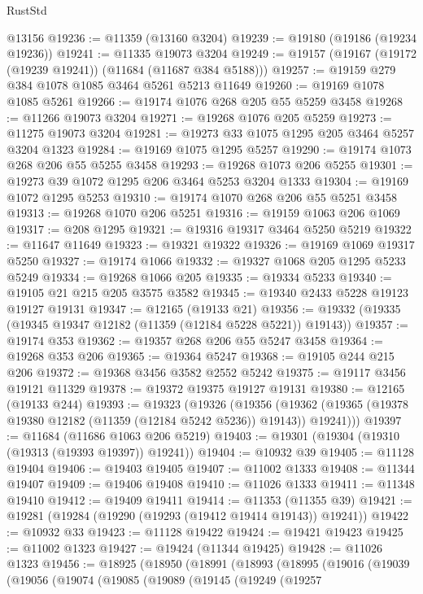 \begin{lexlean}{RustStd}
\begin{coremodule}
{{{{{{{{{{{{{{{{{{{    @13156
@19236 := @11359 (@13160 @3204)
@19239 := @19180 (@19186 (@19234 @19236))
@19241 := @11335 @19073 @3204
@19249 := @19157 (@19167 (@19172 (@19239 @19241)) (@11684 (@11687 @384 @5188)))
@19257 := @19159 @279 @384 @1078 @1085 @3464 @5261 @5213 @11649
@19260 := @19169 @1078 @1085 @5261
@19266 := @19174 @1076 @268 @205 @55 @5259 @3458
@19268 := @11266 @19073 @3204
@19271 := @19268 @1076 @205 @5259
@19273 := @11275 @19073 @3204
@19281 := @19273 @33 @1075 @1295 @205 @3464 @5257 @3204 @1323
@19284 := @19169 @1075 @1295 @5257
@19290 := @19174 @1073 @268 @206 @55 @5255 @3458
@19293 := @19268 @1073 @206 @5255
@19301 := @19273 @39 @1072 @1295 @206 @3464 @5253 @3204 @1333
@19304 := @19169 @1072 @1295 @5253
@19310 := @19174 @1070 @268 @206 @55 @5251 @3458
@19313 := @19268 @1070 @206 @5251
@19316 := @19159 @1063 @206 @1069
@19317 := @208 @1295
@19321 := @19316 @19317 @3464 @5250 @5219
@19322 := @11647 @11649
@19323 := @19321 @19322
@19326 := @19169 @1069 @19317 @5250
@19327 := @19174 @1066
@19332 := @19327 @1068 @205 @1295 @5233 @5249
@19334 := @19268 @1066 @205
@19335 := @19334 @5233
@19340 := @19105 @21 @215 @205 @3575 @3582
@19345 := @19340 @2433 @5228 @19123 @19127 @19131
@19347 := @12165 (@19133 @21)
@19356 := @19332 (@19335 (@19345 @19347 @12182 (@11359 (@12184 @5228 @5221)) @19143))
@19357 := @19174 @353
@19362 := @19357 @268 @206 @55 @5247 @3458
@19364 := @19268 @353 @206
@19365 := @19364 @5247
@19368 := @19105 @244 @215 @206
@19372 := @19368 @3456 @3582 @2552 @5242
@19375 := @19117 @3456 @19121 @11329
@19378 := @19372 @19375 @19127 @19131
@19380 := @12165 (@19133 @244)
@19393 := @19323
    (@19326
      (@19356 (@19362 (@19365 (@19378 @19380 @12182 (@11359 (@12184 @5242 @5236)) @19143)) @19241)))
@19397 := @11684 (@11686 @1063 @206 @5219)
@19403 := @19301 (@19304 (@19310 (@19313 (@19393 @19397)) @19241))
@19404 := @10932 @39
@19405 := @11128 @19404
@19406 := @19403 @19405
@19407 := @11002 @1333
@19408 := @11344 @19407
@19409 := @19406 @19408
@19410 := @11026 @1333
@19411 := @11348 @19410
@19412 := @19409 @19411
@19414 := @11353 (@11355 @39)
@19421 := @19281 (@19284 (@19290 (@19293 (@19412 @19414 @19143)) @19241))
@19422 := @10932 @33
@19423 := @11128 @19422
@19424 := @19421 @19423
@19425 := @11002 @1323
@19427 := @19424 (@11344 @19425)
@19428 := @11026 @1323
@19456 := @18925
    (@18950
      (@18991
        (@18993
          (@18995
            (@19016
              (@19039
                (@19056
                  (@19074
                    (@19085
                      (@19089
                        (@19145
                          (@19249
                            (@19257
}}}}}}}}}}}}}}}}}}}
\end{coremodule}
\end{lexlean}
